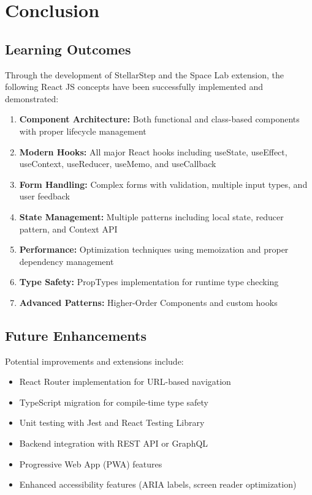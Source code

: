 \documentclass[12pt,a4paper]{article}
\begin{document}
\newpage

\section{Conclusion}

\subsection{Learning Outcomes}
Through the development of StellarStep and the Space Lab extension, the following React JS concepts have been successfully implemented and demonstrated:

\begin{enumerate}
    \item \textbf{Component Architecture:} Both functional and class-based components with proper lifecycle management
    \item \textbf{Modern Hooks:} All major React hooks including useState, useEffect, useContext, useReducer, useMemo, and useCallback
    \item \textbf{Form Handling:} Complex forms with validation, multiple input types, and user feedback
    \item \textbf{State Management:} Multiple patterns including local state, reducer pattern, and Context API
    \item \textbf{Performance:} Optimization techniques using memoization and proper dependency management
    \item \textbf{Type Safety:} PropTypes implementation for runtime type checking
    \item \textbf{Advanced Patterns:} Higher-Order Components and custom hooks
\end{enumerate}

\subsection{Future Enhancements}
Potential improvements and extensions include:
\begin{itemize}
    \item React Router implementation for URL-based navigation
    \item TypeScript migration for compile-time type safety
    \item Unit testing with Jest and React Testing Library
    \item Backend integration with REST API or GraphQL
    \item Progressive Web App (PWA) features
    \item Enhanced accessibility features (ARIA labels, screen reader optimization)
\end{itemize}
\end{document}

